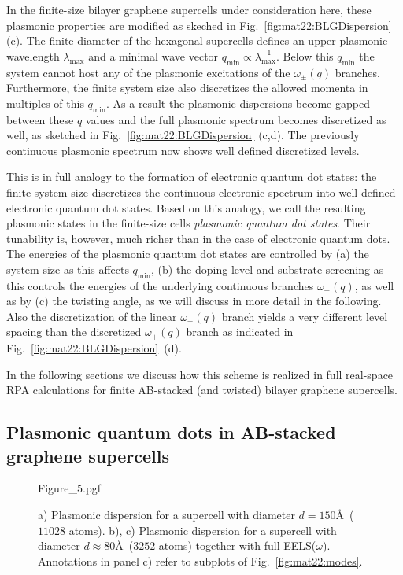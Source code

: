 In the finite-size bilayer graphene supercells under consideration here, these plasmonic properties are modified as skeched in Fig.~\ref{fig:mat22:BLGDispersion} (c). The finite diameter of the hexagonal supercells defines an upper plasmonic wavelength $\lambda_\text{max}$ and a minimal wave vector $q_\text{min} \propto \lambda_\text{max}^{-1}$. Below this $q_\text{min}$ the system cannot host any of the plasmonic excitations of the $\omega_{\pm}(q)$ branches. Furthermore, the finite system size also discretizes the allowed momenta in multiples of this $q_\text{min}$. As a result the plasmonic dispersions become gapped between these $q$ values and the full plasmonic spectrum becomes discretized as well, as sketched in Fig.~\ref{fig:mat22:BLGDispersion} (c,d). The previously continuous plasmonic spectrum now shows well defined discretized levels.

This is in full analogy to the formation of electronic quantum dot states: the finite system size discretizes the continuous electronic spectrum into well defined electronic quantum dot states. Based on this analogy, we call the resulting plasmonic states in the finite-size cells \emph{plasmonic quantum dot states}.  Their tunability is, however, much richer than in the case of electronic quantum dots. The energies of the plasmonic quantum dot states are controlled by (a) the system size as this affects $q_\text{min}$, (b) the doping level and substrate screening as this controls the energies of the underlying continuous branches $\omega_{\pm}(q)$, as well as by (c) the twisting angle, as we will discuss in more detail in the following. Also the discretization of the linear $\omega_-(q)$ branch yields a very different level spacing than the discretized $\omega_+(q)$ branch as indicated in Fig.~\ref{fig:mat22:BLGDispersion}~(d).

In the following sections we discuss how this scheme is realized in full real-space RPA calculations for finite AB-stacked (and twisted) bilayer graphene supercells.
    
\subsection{Plasmonic quantum dots in AB-stacked graphene supercells}
    
\begin{figure}
    \centering
    \label{fig:mat22:EELS}
    {Figure_5.pgf}
    \caption{a) Plasmonic dispersion for a supercell with diameter $d=150$\AA\ ($11028$ atoms). b), c) Plasmonic dispersion for a supercell with diameter $d\approx80$\AA\ ($3252$ atoms) together with full EELS($\omega$). Annotations in panel c) refer to subplots of Fig.~\ref{fig:mat22:modes}.}
\end{figure}
        
